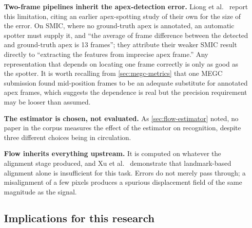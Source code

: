 \textbf{Two-frame pipelines inherit the apex-detection error.} Liong et al.~\cite{liong2019a} report this limitation, citing an earlier apex-spotting study of their own for the size of the error. On SMIC, where no ground-truth apex is annotated, an automatic spotter must supply it, and ``the average of frame difference between the detected and ground-truth apex is 13 frames''; they attribute their weaker SMIC result directly to ``extracting the features from imprecise apex frame.'' Any representation that depends on locating one frame correctly is only as good as the spotter. It is worth recalling from \autoref{sec:megc-metrics} that one MEGC submission found mid-position frames to be an adequate substitute for annotated apex frames, which suggests the dependence is real but the precision requirement may be looser than assumed.

\textbf{The estimator is chosen, not evaluated.} As \autoref{sec:flow-estimator} noted, no paper in the corpus measures the effect of the estimator on recognition, despite three different choices being in circulation.

\textbf{Flow inherits everything upstream.} It is computed on whatever the alignment stage produced, and Xu et al.~\cite{xu2017} demonstrate that landmark-based alignment alone is insufficient for this task. Errors do not merely pass through; a misalignment of a few pixels produces a spurious displacement field of the same magnitude as the signal.

\subsection{Implications for this research}
\label{sec:flow-implications}

